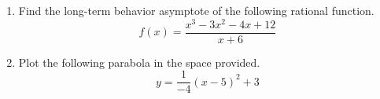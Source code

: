 \documentclass{article}
\begin{document}
\begin{enumerate}
\begin{center}
\CartesianPlane[axes=yes,h=10,w=10]
\end{center} \vspace{1cm}

\newpage

\item Find the long-term behavior asymptote of the following rational function. \[ f(x) = \frac{x^3 - 3x^2 - 4x + 12}{x + 6} \] \vspace{6cm}

\item Plot the following parabola in the space provided. \[ y = \frac{1}{-4} \left(x - 5\right)^2 +3 \]

\begin{center}
\CartesianPlane[axes=yes,h=10,w=10]
\end{center} \vspace{1cm}
\end{enumerate}
\end{document}
